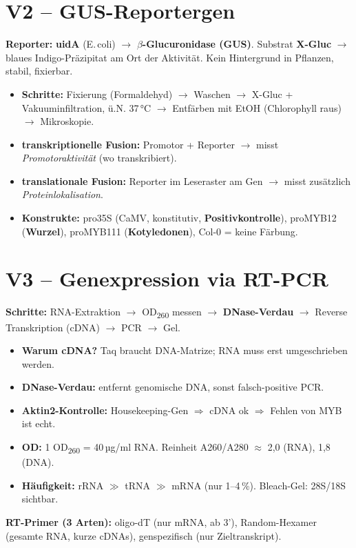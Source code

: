 

\section{V2 -- GUS-Reportergen}
\textbf{Reporter:} \textbf{uidA} (E.\,coli) $\to$ \textbf{$\beta$-Glucuronidase (GUS)}. Substrat \textbf{X-Gluc} $\to$ blaues Indigo-Präzipitat am Ort der Aktivität. Kein Hintergrund in Pflanzen, stabil, fixierbar.
\begin{itemize}
    \item \textbf{Schritte:} Fixierung (Formaldehyd) $\to$ Waschen $\to$ X-Gluc + Vakuuminfiltration, ü.N. 37\,°C $\to$ Entfärben mit EtOH (Chlorophyll raus) $\to$ Mikroskopie.
    \item \textbf{transkriptionelle Fusion:} Promotor + Reporter $\to$ misst \emph{Promotoraktivität} (wo transkribiert).
    \item \textbf{translationale Fusion:} Reporter im Leseraster am Gen $\to$ misst zusätzlich \emph{Proteinlokalisation}.
    \item \textbf{Konstrukte:} pro35S (CaMV, konstitutiv, \textbf{Positivkontrolle}), proMYB12 (\textbf{Wurzel}), proMYB111 (\textbf{Kotyledonen}), Col-0 = keine Färbung.
\end{itemize}





\section{V3 -- Genexpression via RT-PCR}
\textbf{Schritte:} RNA-Extraktion $\to$ OD\textsubscript{260} messen $\to$ \textbf{DNase-Verdau} $\to$ Reverse Transkription (cDNA) $\to$ PCR $\to$ Gel.
\begin{itemize}
    \item \textbf{Warum cDNA?} Taq braucht DNA-Matrize; RNA muss erst umgeschrieben werden.
    \item \textbf{DNase-Verdau:} entfernt genomische DNA, sonst falsch-positive PCR.
    \item \textbf{Aktin2-Kontrolle:} Housekeeping-Gen $\Rightarrow$ cDNA ok $\Rightarrow$ Fehlen von MYB ist echt.
    \item \textbf{OD:} 1 OD\textsubscript{260} = 40\,µg/ml RNA. Reinheit A260/A280 $\approx$ 2,0 (RNA), 1,8 (DNA).
    \item \textbf{Häufigkeit:} rRNA $\gg$ tRNA $\gg$ mRNA (nur 1--4\,\%). Bleach-Gel: 28S/18S sichtbar.
\end{itemize}
\textbf{RT-Primer (3 Arten):} oligo-dT (nur mRNA, ab 3'), Random-Hexamer (gesamte RNA, kurze cDNAs), genspezifisch (nur Zieltranskript).





